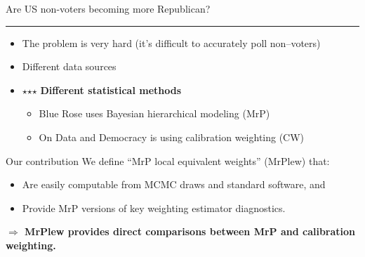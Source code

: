 
\begin{frame}{Are US non-voters becoming more Republican?}

\vspace{1em}
\pause
%
\hrule
\begin{itemize}
\item The problem is very hard (it's difficult to accurately poll non--voters)
\item Different data sources
%
%
\item $\star$$\star$$\star$ \textbf{Different statistical methods}
\begin{itemize}
    \item Blue Rose uses Bayesian hierarchical modeling (MrP)
    \item On Data and Democracy is using calibration weighting (CW)
\end{itemize}
%
\end{itemize}

\pause

\begin{block}{Our contribution}
    We define ``MrP local equivalent weights'' (MrPlew) that:
\begin{itemize}
    \item Are easily computable from MCMC draws and standard software, and
    \item Provide MrP versions of key weighting estimator diagnostics.
\end{itemize}
%
\textbf{$\Rightarrow$ MrPlew provides direct comparisons between
MrP and calibration weighting.}
%
\end{block}

\end{frame}


